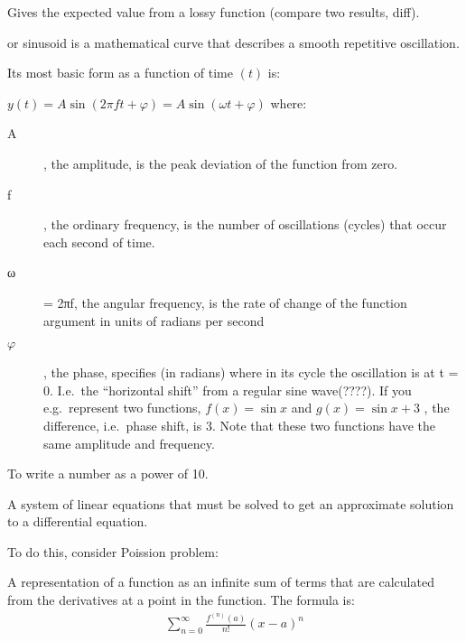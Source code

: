 \begin{definition}
    Gives the expected value from a lossy function (compare two results, diff).
\end{definition}

\begin{definition}
or sinusoid is a mathematical curve that describes a smooth repetitive
oscillation.

Its most basic form as a function of time $(t)$ is:

$y(t) = A\sin(2 \pi f t + \varphi) = A\sin(\omega t + \varphi)$
where:
\begin{description}
    \item[A], the amplitude, is the peak deviation of the function from zero.
    \item[f], the ordinary frequency, is the number of oscillations (cycles)
        that occur each second of time.
    \item[ω] = 2πf, the angular frequency, is the rate of change of the
    function argument in units of radians per second 
    \item[$\varphi$], the phase, specifies (in radians) where in its cycle the
        oscillation is at t = 0. I.e.\ the ``horizontal shift'' from a regular
        sine wave(????).
    If you e.g.\ represent two functions, $f(x) = \sin{x}$ and $g(x) = \sin{x} + 3$
    , the difference, i.e.\ phase shift, is 3. Note that these two functions
    have the same amplitude and frequency.
\end{description}

\end{definition}

\begin{definition}
    To write a number as a power of 10.
\end{definition}

\begin{definition}
    A system of linear equations that must be solved to get an approximate
    solution to a differential equation.

    To do this, consider Poission problem:
\end{definition}

\begin{definition}
    A representation of a function as an infinite sum of terms that are 
    calculated from the derivatives at a point in the function.
    The formula is:
    \begin{align}
        \sum\limits_{n=0}^{\infty}{\frac{f^{(n)}(a)}{n!}{(x-a)}^{n}}
    \end{align}
\end{definition}

